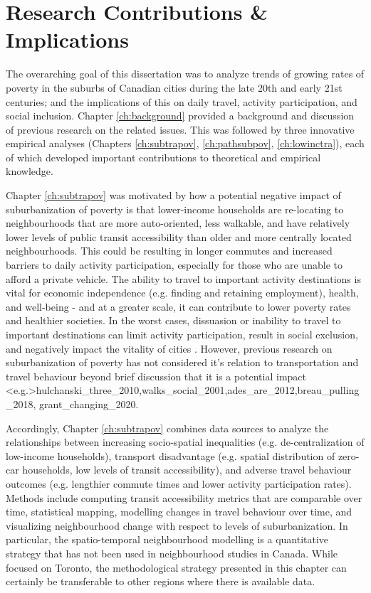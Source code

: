 
\section{Research Contributions \& Implications}

The overarching goal of this dissertation was to analyze trends of growing rates of poverty in the suburbs of Canadian cities during the late 20th and early 21st centuries; and the implications of this on daily travel, activity participation, and social inclusion. Chapter \ref{ch:background} provided a background and discussion of previous research on the related issues. This was followed by three innovative empirical analyses (Chapters \ref{ch:subtrapov}, \ref{ch:pathsubpov}, \ref{ch:lowinctra}), each of which developed important contributions to theoretical and empirical knowledge.

Chapter \ref{ch:subtrapov} was motivated by how a potential negative impact of suburbanization of poverty is that lower-income households are re-locating to neighbourhoods that are more auto-oriented, less walkable, and have relatively lower levels of public transit accessibility than older and more centrally located neighbourhoods. This could be resulting in longer commutes and increased barriers to daily activity participation, especially for those who are unable to afford a private vehicle. The ability to travel to important activity destinations is vital for economic independence (e.g. finding and retaining employment), health, and well-being - and at a greater scale, it can contribute to lower poverty rates and healthier societies. In the worst cases, dissuasion or inability to travel to important destinations can limit activity participation, result in social exclusion, and negatively impact the vitality of cities \cite{lucas_transport_2012,martens_transport_2016}. However, previous research on suburbanization of poverty has not considered it's relation to transportation and travel behaviour beyond brief discussion that it is a potential impact \shortcite<e.g.>{hulchanski_three_2010,walks_social_2001,ades_are_2012,breau_pulling_2018, grant_changing_2020}. 

Accordingly, Chapter \ref{ch:subtrapov} combines data sources to analyze the relationships between increasing socio-spatial inequalities (e.g. de-centralization of low-income households), transport disadvantage (e.g. spatial distribution of zero-car households, low levels of transit accessibility), and adverse travel behaviour outcomes (e.g. lengthier commute times and lower activity participation rates). Methods include computing transit accessibility metrics that are comparable over time, statistical mapping, modelling changes in travel behaviour over time, and visualizing neighbourhood change with respect to levels of suburbanization. In particular, the spatio-temporal neighbourhood modelling is a quantitative strategy that has not been used in neighbourhood studies in Canada. While focused on Toronto, the methodological strategy presented in this chapter can certainly be transferable to other regions where there is available data.

